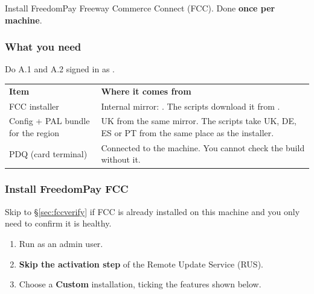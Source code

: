 \documentclass[a4paper,10pt]{article}
\begin{document}
Install FreedomPay Freeway Commerce Connect (FCC). Done \textbf{once per
machine}.

\subsubsection{What you need}

Do A.1 and A.2 signed in as .

\begin{center}
\renewcommand{\arraystretch}{1.35}\small
\begin{tabularx}{\textwidth}{L{44mm} X}
\color{white}\textbf{Item} &
\color{white}\textbf{Where it comes from}\\
FCC installer &
Internal mirror: .
The scripts download it from
.\\
Config + PAL bundle for the region &
UK from the same mirror. The scripts take UK, DE, ES or PT from the same
place as the installer.\\
PDQ (card terminal) &
Connected to the machine. You cannot check the build without it.\\
\end{tabularx}
\end{center}

\subsubsection{Install FreedomPay FCC}

Skip to \S\ref{sec:fccverify} if FCC is already installed on this machine and
you only need to confirm it is healthy.

\begin{enumerate}
  \item Run  as an admin user.

  \item \textbf{Skip the activation step} of the Remote Update Service
        (RUS).

  \item Choose a \textbf{Custom} installation, ticking the features shown
        below.
\end{enumerate}

\end{document}
